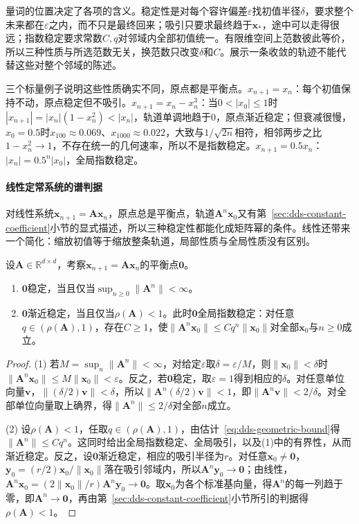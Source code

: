 量词的位置决定了各项的含义。稳定性是对每个容许偏差$\varepsilon$找初值半径$\delta$，要求整个未来都在$\varepsilon$之内，而不只是最终回来；吸引只要求最终趋于$\bm x_*$，途中可以走得很远；指数稳定要求常数$C,q$对邻域内全部初值统一。有限维空间上范数彼此等价，所以三种性质与所选范数无关，换范数只改变$\delta$和$C$。展示一条收敛的轨迹不能代替这些对整个邻域的陈述。

三个标量例子说明这些性质确实不同，原点都是平衡点。$x_{n+1}=x_n$：每个初值保持不动，原点稳定但不吸引。$x_{n+1}=x_n-x_n^3$：当$0<|x_0|\leq1$时$|x_{n+1}|=|x_n|(1-x_n^2)<|x_n|$，轨道单调地趋于$0$，原点渐近稳定；但衰减很慢，$x_0=0.5$时$x_{100}\approx0.069$、$x_{1000}\approx0.022$，大致与$1/\sqrt{2n}$相符，相邻两步之比$1-x_n^2\to1$，不存在统一的几何速率，所以不是指数稳定。$x_{n+1}=0.5x_n$：$|x_n|=0.5^n|x_0|$，全局指数稳定。

\paragraph{线性定常系统的谱判据}
对线性系统$\bm x_{n+1}=\bm A\bm x_n$，原点总是平衡点，轨道$\bm A^n\bm x_0$又有第~\ref{sec:dds-constant-coefficient}小节的显式描述，所以三种稳定性都能化成矩阵幂的条件。线性还带来一个简化：缩放初值等于缩放整条轨道，局部性质与全局性质没有区别。

\begin{theorem}[离散线性定常系统的稳定性判据]
\label{thm:dynamical-discrete-spectral-stability}
\label{thm:dds-spectral-stability}
设$\bm A\in\mathbb R^{d\times d}$，考察$\bm x_{n+1}=\bm A\bm x_n$的平衡点$\bm 0$。
\begin{enumerate}
  \item $\bm 0$稳定，当且仅当$\sup_{n\geq0}\lVert\bm A^n\rVert<\infty$。
  \item $\bm 0$渐近稳定，当且仅当$\rho(\bm A)<1$。此时$\bm 0$全局指数稳定：对任意$q\in(\rho(\bm A),1)$，存在$C\geq1$，使$\lVert\bm A^n\bm x_0\rVert\leq Cq^n\lVert\bm x_0\rVert$对全部$\bm x_0$与$n\geq0$成立。
\end{enumerate}
\end{theorem}

\begin{proof}
(1) 若$M=\sup_n\lVert\bm A^n\rVert<\infty$，对给定$\varepsilon$取$\delta=\varepsilon/M$，则$\lVert\bm x_0\rVert<\delta$时$\lVert\bm A^n\bm x_0\rVert\leq M\lVert\bm x_0\rVert<\varepsilon$。反之，若$\bm 0$稳定，取$\varepsilon=1$得到相应的$\delta$。对任意单位向量$\bm v$，$\lVert(\delta/2)\bm v\rVert<\delta$，所以$\lVert\bm A^n(\delta/2)\bm v\rVert<1$，即$\lVert\bm A^n\bm v\rVert<2/\delta$。对全部单位向量取上确界，得$\lVert\bm A^n\rVert\leq2/\delta$对全部$n$成立。

(2) 设$\rho(\bm A)<1$，任取$q\in(\rho(\bm A),1)$，由估计~\eqref{eq:dds-geometric-bound}得$\lVert\bm A^n\rVert\leq Cq^n$。这同时给出全局指数稳定、全局吸引，以及(1)中的有界性，从而渐近稳定。反之，设$\bm 0$渐近稳定，相应的吸引半径为$r$。对任意$\bm x_0\neq\bm 0$，$\bm y_0=(r/2)\bm x_0/\lVert\bm x_0\rVert$落在吸引邻域内，所以$\bm A^n\bm y_0\to\bm 0$；由线性，$\bm A^n\bm x_0=(2\lVert\bm x_0\rVert/r)\bm A^n\bm y_0\to\bm 0$。取$\bm x_0$为各个标准基向量，得$\bm A^n$的每一列趋于零，即$\bm A^n\to\bm 0$，再由第~\ref{sec:dds-constant-coefficient}小节所引的判据得$\rho(\bm A)<1$。
\end{proof}

